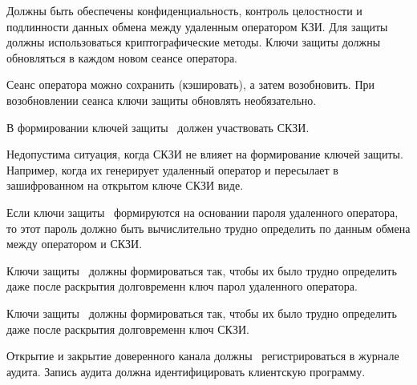 \label{R.TC.Crypto} %
Должны быть обеспечены конфиденциальность, контроль целостности и подлинности 
данных обмена между удаленным оператором КЗИ.
%
Для защиты должны использоваться криптографические методы.
%
Ключи защиты должны обновляться в каждом новом сеансе оператора.

\begin{note}
Сеанс оператора можно сохранить (кэшировать), а затем возобновить.
При возобновлении сеанса ключи защиты обновлять необязательно.
\end{note}

\label{R.TC.Keys} %
В формировании ключей защиты~ должен участвовать СКЗИ.

\begin{note}
Недопустима ситуация, когда СКЗИ не влияет на формирование ключей защиты.
Например, когда их генерирует удаленный оператор и пересылает 
в зашифрованном на открытом ключе СКЗИ виде.
\end{note}

\label{R.TC.Pwd} %
Если ключи защиты~ формируются на основании пароля
удаленного оператора, то этот пароль должно быть вычислительно
трудно определить по данным обмена между оператором и СКЗИ.

\label{R.TC.FSWeak} %
Ключи защиты~ должны формироваться так, чтобы их было 
 трудно определить даже после раскрытия 
долговременн ключ  
парол удаленного оператора.

\label{R.TC.FS} %
Ключи защиты~ должны формироваться так, 
чтобы их было  трудно определить даже после 
раскрытия долговременн ключ СКЗИ.

\label{R.TC.AU} %
Открытие и закрытие доверенного канала должны~ 
регистрироваться в журнале аудита. Запись аудита должна идентифицировать 
клиентскую программу.



